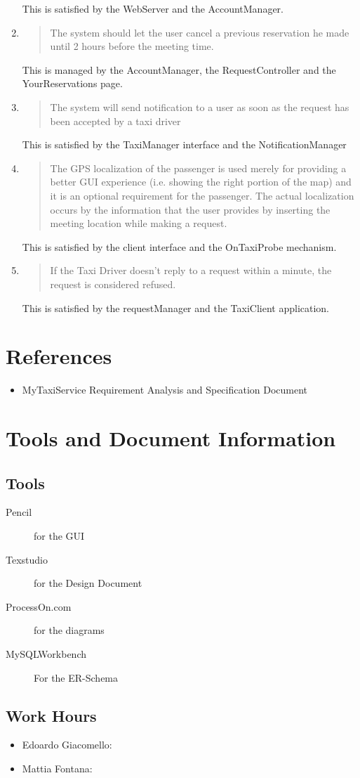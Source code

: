 \documentclass[11pt, a4paper,titlepage]{article}
\newcommand{\productname}{MyTaxiService }
\begin{document}
\begin{enumerate}
\begin{quotation}
		\end{quotation}
			This is satisfied by the WebServer and the AccountManager.
		\item
		\begin{quotation} 
			 The system should let the user cancel a previous reservation he made until 2 hours before the meeting time.
			\end{quotation}
			This is managed by the AccountManager, the RequestController and the YourReservations page.
			\item
			\begin{quotation} 
				 The system will send notification to a user as soon as the request has been accepted by a taxi driver
		\end{quotation}
			This is satisfied by the TaxiManager interface and the NotificationManager
		\item
		\begin{quotation} 
			 The GPS localization of the passenger is used merely for providing a better GUI experience (i.e. showing the right portion of the map) and it is an optional requirement for the passenger. The actual localization occurs by the information that the user provides by inserting the meeting location while making a request.
			\end{quotation}
			This is satisfied by the client interface and the OnTaxiProbe mechanism.
			\item
			\begin{quotation} 
				 If the Taxi Driver doesn't reply to a request within a minute, the request is considered refused.	 
			\end{quotation}
			This is satisfied by the requestManager and the TaxiClient application.
			\end{enumerate}
		
\section{References}
\begin{itemize}
	\item \productname Requirement Analysis and Specification Document
\end{itemize}
\section{Tools and Document Information}
	\subsection{Tools}
	\begin{description}
		\item[Pencil] for the GUI
		\item [Texstudio] for the Design Document
		\item [ProcessOn.com] for the diagrams 
		\item[MySQLWorkbench] For the ER-Schema 
	\end{description}
	\subsection{Work Hours}
	\begin{itemize}
		\item Edoardo Giacomello:
		\item Mattia Fontana: 
	\end{itemize}
\end{document}
